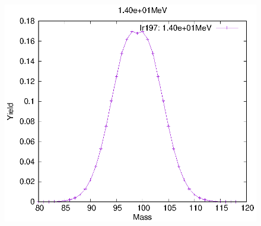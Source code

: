 \begin{figure}[htbp]
\begin{minipage}{0.33\textwidth} \begin{center} \includegraphics[width=\textwidth]{YA/Ir197_1.40e+01.eps} \end{center} \end{minipage}
\end{figure}
\clearpage

